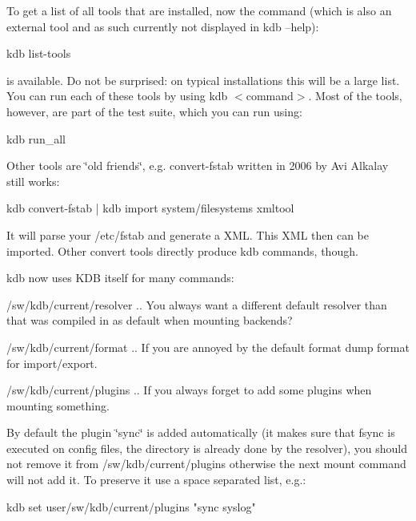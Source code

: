 To get a list of all tools that are installed, now the command (which is also an external tool and as such currently not displayed in kdb --help)\+:


\begin{DoxyCode}
kdb list-tools
\end{DoxyCode}


is available. Do not be surprised\+: on typical installations this will be a large list. You can run each of these tools by using kdb $<$command$>$. Most of the tools, however, are part of the test suite, which you can run using\+:


\begin{DoxyCode}
kdb run\_all
\end{DoxyCode}


Other tools are \char`\"{}old friends\char`\"{}, e.\+g. convert-\/fstab written in 2006 by Avi Alkalay still works\+:


\begin{DoxyCode}
kdb convert-fstab | kdb import system/filesystems xmltool
\end{DoxyCode}


It will parse your /etc/fstab and generate a X\+ML. This X\+ML then can be imported. Other convert tools directly produce kdb commands, though.

kdb now uses K\+DB itself for many commands\+:


\begin{DoxyItemize}
\item /sw/kdb/current/resolver .. You always want a different default resolver than that was compiled in as default when mounting backends?
\item /sw/kdb/current/format .. If you are annoyed by the default format dump format for import/export.
\item /sw/kdb/current/plugins .. If you always forget to add some plugins when mounting something.
\end{DoxyItemize}

By default the plugin \char`\"{}sync\char`\"{} is added automatically (it makes sure that fsync is executed on config files, the directory is already done by the resolver), you should not remove it from /sw/kdb/current/plugins otherwise the next mount command will not add it. To preserve it use a space separated list, e.\+g.\+:


\begin{DoxyCode}
kdb set user/sw/kdb/current/plugins "sync syslog"
\end{DoxyCode}


